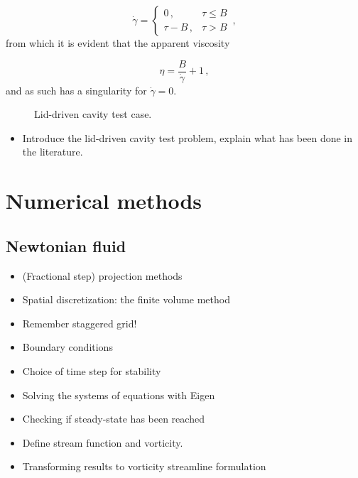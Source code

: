 \documentclass[final,3p,twocolumn]{elsarticle}
\begin{document}
\begin{equation}
    \dot{\gamma} = \begin{cases}
        0 \,,& \tau \leq B \\ 
        \tau - B \,,& \tau > B \end{cases} \,,
    \label{eq:bingham}
\end{equation}
%
from which it is evident that the apparent viscosity 

\begin{equation}
    \eta = \frac{B}{\dot{\gamma}} + 1 \,,
    \label{eq:binghamViscosity}
\end{equation}
%
and as such has a singularity for $\dot{\gamma}=0$. 

\begin{figure}[htb]
    \centering
    \begin{tikzpicture}
        
    \end{tikzpicture}
    \caption{Lid-driven cavity test case.}
    \label{fig:lidDrivenCavity}
\end{figure}

\begin{itemize}
    \item Introduce the lid-driven cavity test problem, explain what has been
        done in the literature. 
\end{itemize}

\section{Numerical methods}
\label{sec:numerical}

\subsection{Newtonian fluid}
\label{subsec:newtonian}

\begin{itemize}
    \item (Fractional step) projection methods 
    \item Spatial discretization: the finite volume method
    \item Remember staggered grid!
    \item Boundary conditions
    \item Choice of time step for stability
    \item Solving the systems of equations with Eigen
    \item Checking if steady-state has been reached
    \item Define stream function and vorticity.
    \item Transforming results to vorticity streamline formulation
\end{itemize}
\end{document}
